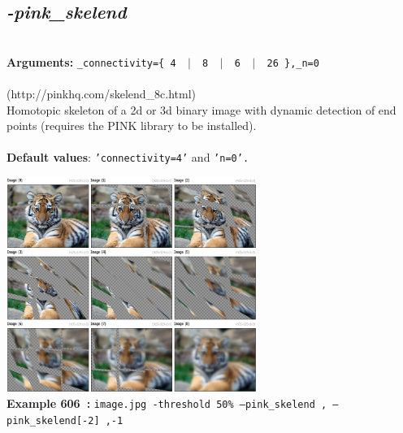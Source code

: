\documentclass[a4paper,11pt,twoside]{book}
\begin{document}
\subsection{\emph{-pink\_skelend} }\vspace*{-0.5em}
~\\\textbf{Arguments: } 
{\small \texttt{\_connectivity=\{ 4 ~$|$~ 8 ~$|$~ 6 ~$|$~ 26 \},\_n=0}}\\~\\
(http://pinkhq.com/skelend\_8c.html)
~\\Homotopic skeleton of a 2d or 3d binary image with dynamic detection of end points (requires the PINK library to be installed).
~\\~\\\textbf{Default values}: {\small \texttt{'connectivity=4'} and \texttt{'n=0'.}}
\begin{center}\includegraphics[keepaspectratio=true,height=7cm,width=\textwidth]{img/gmic_def606.jpg}\\
{\footnotesize \textbf{Example 606~:} \texttt{image.jpg -threshold 50\% --pink\_skelend , --pink\_skelend[-2] ,-1}}
\end{center}
\end{document}
